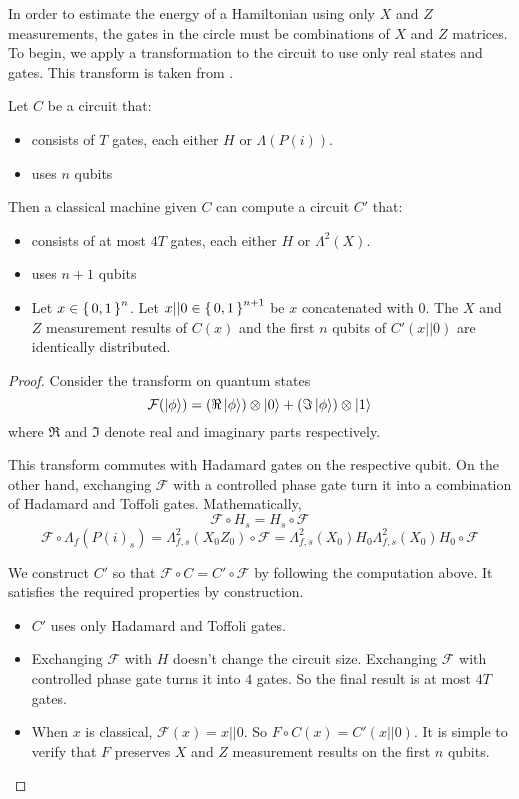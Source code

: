 In order to estimate the energy of a Hamiltonian using only $X$ and $Z$ measurements, the gates in the circle must be combinations of $X$ and $Z$ matrices. To begin, we apply a transformation to the circuit to use only real states and gates. This transform is taken from \cite{quant-ph/0301040}.

\begin{theorem}
	Let $C$ be a circuit that:
	\begin{itemize}
		\item consists of $T$ gates, each either $H$ or $\Lambda(P(i))$.
		\item uses $n$ qubits
	\end{itemize}
	Then a classical machine given $C$ can compute a circuit $C'$ that:
	\begin{itemize}
		\item consists of at most $4T$ gates, each either $H$ or $\Lambda^2(X)$.
		\item uses $n+1$ qubits
		\item Let $x\in\set{0,1}^n$. Let $x||0\in\set{0,1}^{n+1}$ be $x$ concatenated with $0$. The $X$ and $Z$ measurement results of $C(x)$ and the first $n$ qubits of $C'(x||0)$ are identically distributed.
	\end{itemize}
\end{theorem}

\begin{proof}

	Consider the transform on quantum states
	$$\mathcal{F}(\ket{\phi})=(\Re\ket{\phi})\otimes\ket{0}+(\Im\ket{\phi})\otimes\ket{1}$$
	where $\Re$ and $\Im$ denote real and imaginary parts respectively.

	This transform commutes with Hadamard gates on the respective qubit. On the other hand, exchanging $\mathcal{F}$ with a controlled phase gate turn it into a combination of Hadamard and Toffoli gates. Mathematically,
	$$\mathcal{F}\circ H_s=H_s\circ\mathcal{F}$$
	$$\mathcal{F}\circ\Lambda_f(P(i)_s)=\Lambda^2_{f,s}(X_0Z_0)\circ\mathcal{F}=\Lambda^2_{f,s}(X_0)H_0\Lambda^2_{f,s}(X_0)H_0\circ\mathcal{F}$$

	We construct $C'$ so that $\mathcal{F}\circ C=C'\circ\mathcal{F}$ by following the computation above. It satisfies the required properties by construction.
	\begin{itemize}
		\item $C'$ uses only Hadamard and Toffoli gates.
		\item Exchanging $\mathcal{F}$ with $H$ doesn't change the circuit size. Exchanging $\mathcal{F}$ with controlled phase gate turns it into $4$ gates. So the final result is at most $4T$ gates.
		\item When $x$ is classical, $\mathcal{F}(x)=x||0$. So $F\circ C(x)=C'(x||0)$. It is simple to verify that $F$ preserves $X$ and $Z$ measurement results on the first $n$ qubits.
	\end{itemize}
\end{proof}

